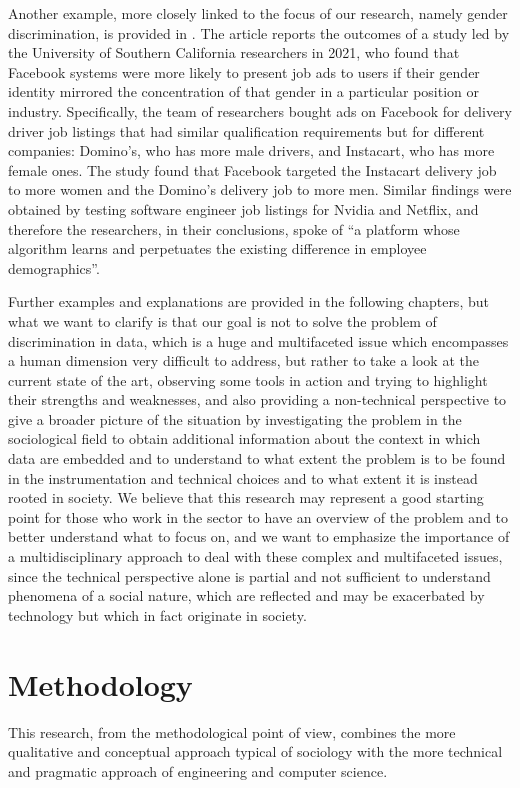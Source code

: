 Another example, more closely linked to the focus of our research, namely gender discrimination, is provided in \cite{horwitz2021facebook}. The article reports the outcomes of a study led by the University of Southern California researchers in 2021, who found that Facebook systems were more likely to present job ads to users if their gender identity mirrored the concentration of that gender in a particular position or industry. Specifically, the team of researchers bought ads on Facebook for delivery driver job listings that had similar qualification requirements but for different companies: Domino's, who has more male drivers, and Instacart, who has more female ones. The study found that Facebook targeted the Instacart delivery job to more women and the Domino's delivery job to more men. Similar findings were obtained by testing software engineer job listings for Nvidia and Netflix, and therefore the researchers, in their conclusions, spoke of ``a platform whose algorithm learns and perpetuates the existing difference in employee demographics''.

Further examples and explanations are provided in the following chapters, but what we want to clarify is that our goal is not to solve the problem of discrimination in data, which is a huge and multifaceted issue which encompasses a human dimension very difficult to address, but rather to take a look at the current state of the art, observing some tools in action and trying to highlight their strengths and weaknesses, and also providing a non-technical perspective to give a broader picture of the situation by investigating the problem in the sociological field to obtain additional information about the context in which data are embedded and to understand to what extent the problem is to be found in the instrumentation and technical choices and to what extent it is instead rooted in society.
We believe that this research may represent a good starting point for those who work in the sector to have an overview of the problem and to better understand what to focus on, and we want to emphasize the importance of a multidisciplinary approach to deal with these complex and multifaceted issues, since the technical perspective alone is partial and not sufficient to understand phenomena of a social nature, which are reflected and may be exacerbated by technology but which in fact originate in society.


\section{Methodology}
This research, from the methodological point of view, combines the more qualitative and conceptual approach typical of sociology with the more technical and pragmatic approach of engineering and computer science.


